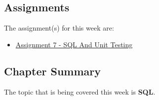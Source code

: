\subsection{Assignments}

The assignment(s) for this week are:

\begin{itemize}
    \item \href{https://github.com/QuantumCompiler/CU/tree/main/CSPB%203308%20-%20Software%20Development%20Methods%20And%20Tools/Assignments/Assignment%207%20-%20SQL%20And%20Unit%20Testing}{Assignment 7 - SQL And Unit Testing}
\end{itemize}

\newpage

\subsection{Chapter Summary}

The topic that is being covered this week is \textbf{SQL}.

